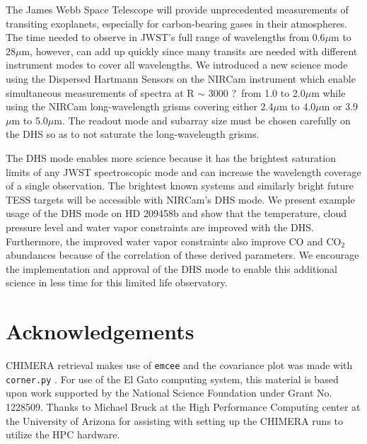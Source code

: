 \documentclass[iop]{emulateapj}
\newcommand{\DHSres}{3000 ?}
\begin{document}
The James Webb Space Telescope will provide unprecedented measurements of transiting exoplanets, especially for carbon-bearing gases in their atmospheres.
The time needed to observe in JWST's full range of wavelengths from 0.6$\mu$m to 28$\mu$m, however, can add up quickly since many transits are needed with different instrument modes to cover all wavelengths.
We introduced a new science mode using the Dispersed Hartmann Sensors on the NIRCam instrument which enable simultaneous measurements of spectra at R $\sim$ \DHSres\ from 1.0 to 2.0$\mu$m while using the NIRCam long-wavelength grisms covering either 2.4$\mu$m to 4.0$\mu$m or 3.9$\mu$m to 5.0$\mu$m.
The readout mode and subarray size must be chosen carefully on the DHS so as to not saturate the long-wavelength grisms.

The DHS mode enables more science because it has the brightest saturation limits of any JWST spectroscopic mode and can increase the wavelength coverage of a single observation.
The brightest known systems and similarly bright future TESS targets will be accessible with NIRCam's DHS mode.
We present example usage of the DHS mode on HD 209458b and show that the temperature, cloud pressure level and water vapor constraints are improved with the DHS.
Furthermore, the improved water vapor constraints also improve CO and CO$_2$ abundances because of the correlation of these derived parameters.
We encourage the implementation and approval of the DHS mode to enable this additional science in less time for this limited life observatory.

\section{Acknowledgements}

CHIMERA retrieval makes use of \texttt{emcee} \citep{foreman-mackey2013emcee} and the covariance plot was made with \texttt{corner.py} \citep{foremanCorner}.
For use of the El Gato computing system, this material is based upon work supported by the National Science Foundation under Grant No. 1228509.
Thanks to Michael Bruck at the High Performance Computing center at the University of Arizona for assisting with setting up the CHIMERA runs to utilize the HPC hardware.

\end{document}
